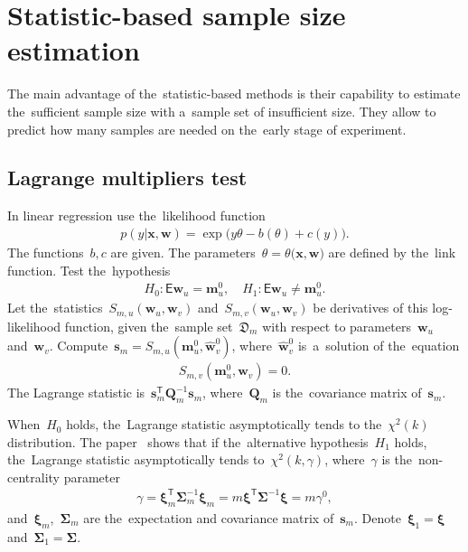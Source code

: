 \documentclass[
11pt,%
tightenlines,%
twoside,%
onecolumn,%
nofloats,%
nobibnotes,%
nofootinbib,%
superscriptaddress,%
noshowpacs,%
centertags]%
{revtex4}
\begin{document}
\section{Statistic-based sample size estimation}
The main advantage of the~statistic-based methods is their capability to estimate the~sufficient sample size with a~sample set of insufficient size. They allow to predict how many samples are needed on the~early stage of experiment.

\subsection{Lagrange multipliers test}
In linear regression use the~likelihood function
\[
\label{eq:sb:1}
\begin{aligned}
	p(y|\mathbf{x}, \mathbf{w}) = \exp\bigl(y\theta- b(\theta) + c\left(y\right)\bigr).
\end{aligned}
\]
The functions~$b, c$ are given. The parameters~$\theta=\theta\bigr(\mathbf{x}, \mathbf{w}\bigr)$ are defined by the~link function. Test the~hypothesis
\[
\label{eq:sb:2}
\begin{aligned}
	H_0: \mathsf{E}\mathbf{w}_{u} = \mathbf{m}^0_{u}, \quad H_1: \mathsf{E}\mathbf{w}_{u} \not= \mathbf{m}^0_{u}.
\end{aligned}
\]
Let the~statistics~$S_{m,u}\left(\mathbf{w}_{u}, \mathbf{w}_{v}\right)$ and~$S_{m,v}\left(\mathbf{w}_{u}, \mathbf{w}_{v}\right)$ be derivatives of this log-likelihood function, given the~sample set~$\mathfrak{D}_{m}$ with respect to parameters~$\mathbf{w}_{u}$ and~$\mathbf{w}_{v}$.
Compute~$\mathbf{s}_{m} = S_{m,u}\left(\mathbf{m}^{0}_{u}, \hat{\mathbf{w}}^{0}_{v}\right)$, where~$\hat{\mathbf{w}}^{0}_{v}$ is~a~solution of the~equation
\[
\label{eq:sb:3}
\begin{aligned}
	S_{m,v}\left(\mathbf{m}^{0}_{u}, \mathbf{w}_{v}\right) = 0.
\end{aligned}
\]
The Lagrange statistic is~$\mathbf{s}^{\mathsf{T}}_{m}\mathbf{Q}_{m}^{-1}\mathbf{s}_{m}$, where~$\mathbf{Q}_{m}$ is the~covariance matrix of~$\mathbf{s}_{m}$.
	
When~$H_0$ holds, the~Lagrange statistic asymptotically tends to the~$\chi^2(k)$ distribution. The paper~\cite{self1988} shows that if the~alternative hypothesis~$H_1$ holds, the~Lagrange statistic asymptotically tends to~$\chi^2(k,\gamma)$, where~$\gamma$ is the~non-centrality parameter
\[
\label{eq:sb:5}
\begin{aligned}
	\gamma = \bm{\xi}_{m}^{\mathsf{T}}\bm{\Sigma}^{-1}_{m}\bm{\xi}_{m} = m\bm{\xi}^{\mathsf{T}}\bm{\Sigma}^{-1}\bm{\xi}= m\gamma^0,
\end{aligned}
\]
and~$\bm{\xi}_{m}$,~$\bm{\Sigma}_{m}$ are the~expectation and covariance matrix of~$\mathbf{s}_{m}$. Denote~$\bm{\xi}_1 = \bm{\xi}$ and~$\bm{\Sigma}_1 = \bm{\Sigma}$. 
	
\end{document}
